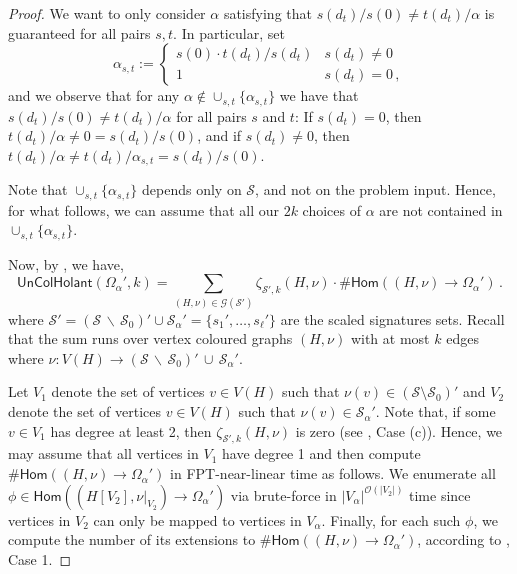 \documentclass[authorcolumns,numberwithinsect]{no-lipics-v2022}
\newcommand{\homs}[2]{\mathsf{Hom}(#1 \to #2)}
\begin{document}
\begin{proof}
We want to only consider $\alpha$ satisfying that $s(d_t)/s(0) \neq t(d_t)/\alpha$ is guaranteed for all pairs $s, t$. In particular, set
\[
\alpha_{s,t} := \begin{cases}
    s(0)\cdot t(d_{t})/s(d_{t}) & s(d_t)\neq 0\\
    1 & s(d_t) = 0\,,
\end{cases}
\]
and we observe that for any $\alpha\notin\cup_{s,t}\{\alpha_{s,t}\}$ we have that  $s(d_t)/s(0) \neq t(d_t)/\alpha$ for all pairs $s$ and $t$: If $s(d_t)=0$, then $t(d_t)/\alpha \neq 0 = s(d_t)/s(0)$, and if $s(d_t)\neq 0$, then $t(d_t)/\alpha \neq t(d_t)/\alpha_{s,t} = s(d_t)/s(0)$.

Note that $\cup_{s,t}\{\alpha_{s,t}\}$ depends only on $\mathcal{S}$, and not on the problem input. Hence, for what follows, we can assume that all our $2k$ choices of $\alpha$ are not contained in $\cup_{s,t}\{\alpha_{s,t}\}$.


Now, by , we have,
\[ \mathsf{UnColHolant}(\Omega_{\alpha}', k) = \sum_{(H,\nu)\in \mathcal{G}(\mathcal{S}')} \zeta_{\mathcal{S}',k}(H,\nu) \cdot \#\homs{(H,\nu)}{\Omega_{\alpha}'}\,. \]
where $\mathcal{S}' = (\mathcal{S}\,\backslash\,\mathcal{S}_0)' \cup \mathcal{S}_{\alpha}' = \{s_1', \ldots, s_\ell'\}$ are the scaled signatures sets. Recall that the sum runs over vertex coloured graphs $(H, \nu)$ with at most $k$ edges where $\nu : V(H) \to (\mathcal{S}\,\backslash\,\mathcal{S}_0)'\,\cup\,\mathcal{S}_{\alpha}'$.

Let $V_1$ denote the set of vertices $v \in V(H)$ such that $\nu(v) \in (\mathcal{S}\setminus\mathcal{S}_0)'$ and $V_2$ denote the set of vertices $v \in V(H)$ such that $\nu(v) \in \mathcal{S}_{\alpha}'$. Note that, if some $v \in V_1$ has degree at least 2, then $\zeta_{\mathcal{S}',k}(H, \nu)$ is zero (see , Case (c)). Hence, we may assume that all vertices in $V_1$ have degree 1 and then compute $\#\homs{(H, \nu)}{\Omega_{\alpha}'}$ in FPT-near-linear time as follows. We enumerate all $\phi \in \homs{(H[V_2], \nu|_{V_2})}{\Omega_{\alpha}'}$ via brute-force in $|V_{\alpha}|^{\mathcal{O}(|V_2|)}$ time since vertices in $V_{2}$ can only be mapped to vertices in $V_{\alpha}$. Finally, for each such $\phi$, we compute the number of its extensions to $\#\homs{(H, \nu)}{\Omega_{\alpha}'}$, according to , Case 1.
\end{proof}
\end{document}
